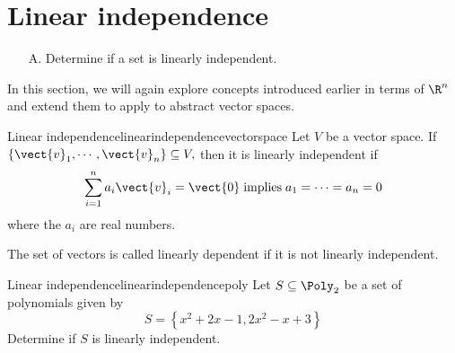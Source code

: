 \section{Linear independence}

\begin{outcome}
\begin{enumerate}
\item[A.] Determine if a set is linearly independent.
\end{enumerate}
\end{outcome}

In this section, we will again explore concepts introduced earlier in terms of $\R^n$ and extend them to apply to abstract vector spaces. 

\begin{definition}{Linear independence}{linearindependencevectorspace}
Let $V$ be a vector space. If $\{\vect{v}_{1},\cdots ,\vect{v}_{n}\} \subseteq V,$ then it is linearly independent
 if
\begin{equation*}
\sum_{i=1}^{n}a_{i}\vect{v}_{i}=\vect{0} \;\mbox{implies}\;
a_{1}=\cdots =a_{n}=0
\end{equation*}
where the $a_i$ are real numbers. 
\end{definition}

The
set of vectors is called linearly dependent if it is not linearly independent.

\begin{example}{Linear independence}{linearindependencepoly}
Let $S \subseteq \Poly_2$ be a set of polynomials given by
\[
S = \left\{ x^2 + 2x - 1, 2x^2 - x + 3 \right\}
\]
Determine if $S$ is linearly independent. 
\end{example}

